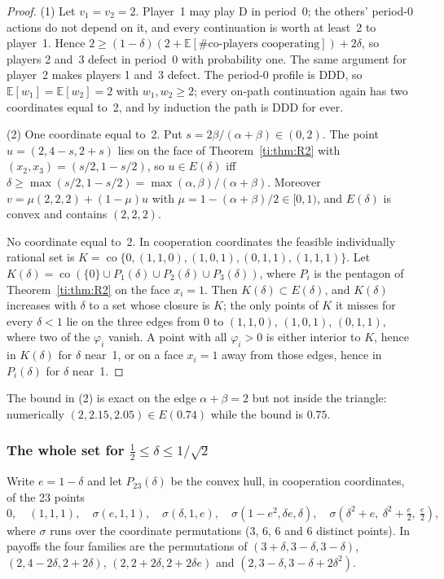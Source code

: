 \documentclass[11pt]{amsart}
\theoremstyle{remark}
\begin{document}
\begin{proof}
(1) Let $v_1=v_2=2$. Player~1 may play D in period~0; the others' period-0 actions do not depend on
it, and every continuation is worth at least~2 to player~1. Hence
$2\ge(1-\delta)(2+\mathbb E[\#\text{co-players cooperating}])+2\delta$, so players 2 and~3 defect in
period~0 with probability one. The same argument for player~2 makes players 1 and~3 defect. The
period-0 profile is DDD, so $\mathbb E[w_1]=\mathbb E[w_2]=2$ with $w_1,w_2\ge2$; every on-path
continuation again has two coordinates equal to~2, and by induction the path is DDD for ever.

(2) One coordinate equal to~2. Put $s=2\beta/(\alpha+\beta)\in(0,2)$. The point
$u=(2,4-s,2+s)$ lies on the face of Theorem~\ref{ti:thm:R2} with $(x_2,x_3)=(s/2,1-s/2)$, so
$u\in E(\delta)$ iff $\delta\ge\max(s/2,1-s/2)=\max(\alpha,\beta)/(\alpha+\beta)$. Moreover
$v=\mu(2,2,2)+(1-\mu)u$ with $\mu=1-(\alpha+\beta)/2\in[0,1)$, and $E(\delta)$ is convex and
contains $(2,2,2)$.

No coordinate equal to~2. In cooperation coordinates the feasible individually rational set is
$K=\operatorname{co}\{0,(1,1,0),(1,0,1),(0,1,1),(1,1,1)\}$. Let
$K(\delta)=\operatorname{co}(\{0\}\cup P_1(\delta)\cup P_2(\delta)\cup P_3(\delta))$, where $P_i$ is the
pentagon of Theorem~\ref{ti:thm:R2} on the face $x_i=1$. Then $K(\delta)\subset E(\delta)$, and
$K(\delta)$ increases with $\delta$ to a set whose closure is $K$; the only points of $K$ it misses
for every $\delta<1$ lie on the three edges from $0$ to $(1,1,0)$, $(1,0,1)$, $(0,1,1)$, where two of
the $\varphi_i$ vanish. A point with all $\varphi_i>0$ is either interior to $K$, hence in $K(\delta)$
for $\delta$ near~1, or on a face $x_i=1$ away from those edges, hence in $P_i(\delta)$ for $\delta$
near~1.
\end{proof}

The bound in (2) is exact on the edge $\alpha+\beta=2$ but not inside the triangle: numerically
$(2,2.15,2.05)\in E(0.74)$ while the bound is $0.75$.

\subsubsection{The whole set for $\frac12\le\delta\le1/\sqrt2$}

Write $e=1-\delta$ and let $P_{23}(\delta)$ be the convex hull, in cooperation coordinates, of the
23 points
\[
0,\quad (1,1,1),\quad \sigma(e,1,1),\quad \sigma(\delta,1,e),\quad \sigma(1-e^2,\delta e,\delta),\quad
\sigma(\delta^2+e,\ \delta^2+\tfrac e2,\ \tfrac e2),
\]
where $\sigma$ runs over the coordinate permutations (3, 6, 6 and 6 distinct points). In payoffs the
four families are the permutations of $(3+\delta,3-\delta,3-\delta)$, $(2,4-2\delta,2+2\delta)$,
$(2,2+2\delta,2+2\delta e)$ and $(2,3-\delta,3-\delta+2\delta^2)$.
\end{document}
